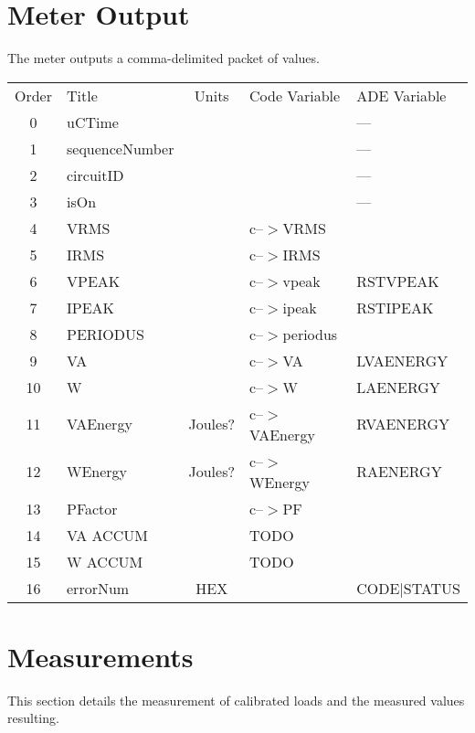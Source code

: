 \documentclass[]{article}
\begin{document}
\section{Meter Output}
The meter outputs a comma-delimited packet of values.

\begin{tabular}{ c l c l l }
Order & Title          & Units     & Code Variable  & ADE Variable \\
0     & uCTime         &           &                & ---          \\
1     & sequenceNumber &           &                & ---          \\
2     & circuitID      &           &                & ---          \\
3     & isOn           &           &                & ---          \\
4     & VRMS           &           & c--$>$VRMS     &              \\
5     & IRMS           &           & c--$>$IRMS     &              \\
6     & VPEAK          &           & c--$>$vpeak    & RSTVPEAK     \\
7     & IPEAK          &           & c--$>$ipeak    & RSTIPEAK     \\
8     & PERIODUS       &           & c--$>$periodus &              \\
9     & VA             &           & c--$>$VA       & LVAENERGY    \\
10    & W              &           & c--$>$W        & LAENERGY     \\
11    & VAEnergy       & Joules?   & c--$>$VAEnergy & RVAENERGY     \\
12    & WEnergy        & Joules?   & c--$>$WEnergy  & RAENERGY     \\
13    & PFactor        &           & c--$>$PF       &              \\
14    & VA ACCUM       &           & TODO        \\
15    & W ACCUM        &           & TODO        \\
16    & errorNum       & HEX       &             & CODE|STATUS\\
\end{tabular}

\section{Measurements}
This section details the measurement of calibrated loads and the
measured values resulting.
\end{document}
